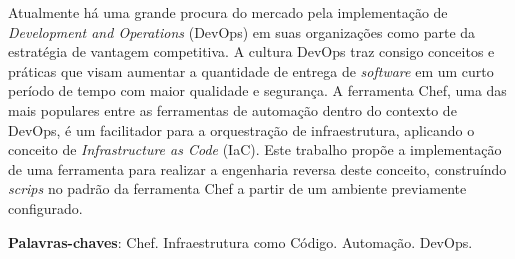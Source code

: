 \begin{resumo}
  Atualmente há uma grande procura do mercado pela implementação de
  \textit{Development and Operations} (DevOps) em suas organizações como parte da estratégia de vantagem
  competitiva. A cultura DevOps traz consigo conceitos e práticas
  que visam aumentar a quantidade de entrega de \textit{software} em um
  curto período de tempo com maior qualidade e segurança. A
  ferramenta Chef, uma das mais populares entre as ferramentas de
  automação dentro do contexto de DevOps, é um facilitador para
  a orquestração de infraestrutura, aplicando o conceito de
  \textit{Infrastructure as Code} (IaC).
  Este trabalho propõe a implementação de uma ferramenta para realizar a 
  engenharia reversa deste conceito, construíndo \textit{scrips} no padrão da 
  ferramenta Chef a partir de um ambiente previamente configurado.

 \vspace{\onelineskip}
 \noindent
    \textbf{Palavras-chaves}: Chef. Infraestrutura como Código. Automação. DevOps.
\end{resumo}
